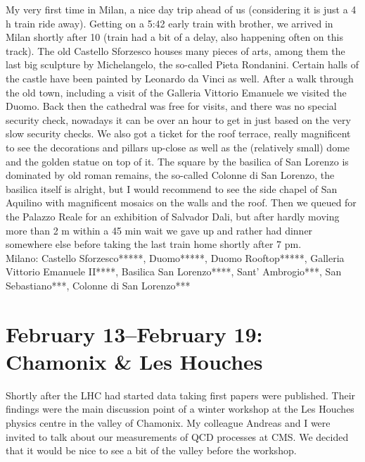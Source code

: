 My very first time in Milan, a nice day trip ahead of us (considering it is just a 4 h train ride away). Getting on a 5:42 early train with brother, we arrived in Milan shortly after 10 (train had a bit of a delay, also happening often on this track). The old Castello Sforzesco houses many pieces of arts, among them the last big sculpture by Michelangelo, the so-called Pieta Rondanini. Certain halls of the castle have been painted by Leonardo da Vinci as well. After a walk through the old town, including a visit of the Galleria Vittorio Emanuele we visited the Duomo. Back then the cathedral was free for visits, and there was no special security check, nowadays it can be over an hour to get in just based on the very slow security checks. We also got a ticket for the roof terrace, really magnificent to see the decorations and pillars up-close as well as the (relatively small) dome and the golden statue on top of it. The square by the basilica of San Lorenzo is dominated by old roman remains, the so-called Colonne di San Lorenzo, the basilica itself is alright, but I would recommend to see the side chapel of San Aquilino with magnificent mosaics on the walls and the roof. Then we queued for the Palazzo Reale for an exhibition of Salvador Dali, but after hardly moving more than 2 m within a 45 min wait we gave up and rather had dinner somewhere else before taking the last train home shortly after 7 pm.\\

Milano: Castello Sforzesco*****, Duomo*****, Duomo Rooftop*****, Galleria Vittorio Emanuele II****, Basilica San Lorenzo****, Sant' Ambrogio***, San Sebastiano***, Colonne di San Lorenzo***

\section{February 13--February 19: Chamonix \& Les Houches}
\label{LesHouches2011}

Shortly after the LHC had started data taking first papers were published. Their findings were the main discussion point of a winter workshop at the Les Houches physics centre in the valley of Chamonix. My colleague Andreas and I were invited to talk about our measurements of QCD processes at CMS. We decided that it would be nice to see a bit of the valley before the workshop.\\

